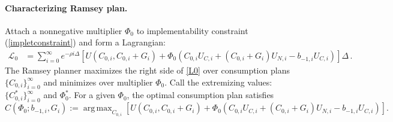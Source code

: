 \documentclass[12pt]{article}
\DeclareMathOperator*{\argmax}{arg\,max}
\newcommand{\WJ}[1]{{\textcolor{red}{#1}}}
\begin{document}
\paragraph{Characterizing Ramsey plan.}  
Attach a  nonnegative multiplier  $\Phi_0$  to implementability constraint  (\ref{impletconstraint}) and form  a Lagrangian: 
\begin{align}\label{L0}
	{\mathcal L}^{}_0 & =  \sum_{i=0}^{\infty}  e^{-\rho i\Delta}\left[ U(C_{0, i}, C_{0, i}+G_{i})+ \Phi_0^{}\left( C_{0, i}U_{C, i}+(C_{0, i}+G_{i})U_{N, i}-b_{-1, i}^{} U_{C, i}\right)  \right] \Delta \, . %
\end{align} %
The Ramsey planner  maximizes the right side of  \eqref{L0} over consumption plans $\{C_{0, i}\}_{i=0}^\infty$   and minimizes over multiplier $\Phi_0$.  Call the extremizing values: $\{C_{0, i}^*\}_{i=0}^\infty$ and $\Phi_0^*$.
For a given $\Phi_0$, the optimal consumption plan satisfies%
\begin{equation}\label{Csoln}
	C(\Phi_0; b_{-1, i}, G_{i}):=\argmax_{C_{0, i}}  \left[ U(C_{0, i}, C_{0, i}+G_{i})+ \Phi_0\left( C_{0, i}U_{C, i}+(C_{0, i}+G_{i})U_{N, i}-b_{-1, i} U_{C, i} \right) \right] .
\end{equation}
\end{document}
